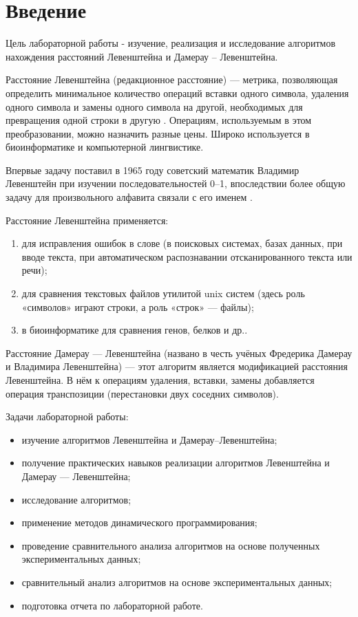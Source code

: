 \chapter*{Введение}

Цель лабораторной работы  - изучение, реализация и исследование алгоритмов нахождения расстояний Левенштейна и Дамерау -- Левенштейна.


Расстояние Левенштейна (редакционное расстояние) — метрика, позволяющая определить минимальное количество операций вставки одного символа, удаления одного символа и замены одного символа на другой, необходимых для превращения одной строки в другую \cite{editor_distance}. Операциям, используемым в этом преобразовании, можно назначить разные цены. Широко используется в биоинформатике и компьютерной лингвистике.


Впервые задачу поставил в 1965 году советский математик Владимир Левенштейн при изучении последовательностей 0--1, впоследствии более общую задачу для произвольного алфавита связали с его именем \cite{Levenshtein}.


Расстояние Левенштейна применяется: 
\begin{enumerate}[label={\arabic*)}]
	\item для исправления ошибок в слове (в поисковых системах, базах данных, при вводе текста, при автоматическом распознавании отсканированного текста или речи);
	\item для сравнения текстовых файлов утилитой  unix систем (здесь роль «символов» играют строки, а роль «строк» — файлы);
	\item в биоинформатике для сравнения генов, белков и др..
\end{enumerate}


Расстояние Дамерау — Левенштейна (названо в честь учёных Фредерика Дамерау и Владимира Левенштейна) — этот алгоритм является модификацией расстояния Левенштейна. В нём к операциям удаления, вставки, замены добавляется операция транспозиции (перестановки двух соседних символов). 

\vspace{2mm}
Задачи лабораторной работы:
\begin{itemize}
	\item изучение алгоритмов Левенштейна и Дамерау--Левенштейна;
	\item получение практических навыков реализации алгоритмов Левенштейна и Дамерау — Левенштейна;
	\item исследование алгоритмов;
	\item применение методов динамического программирования;
	\item проведение сравнительного анализа алгоритмов на основе полученных экспериментальных данных;
	\item сравнительный анализ алгоритмов на основе экспериментальных данных;
	\item подготовка отчета по лабораторной работе.
\end{itemize}
